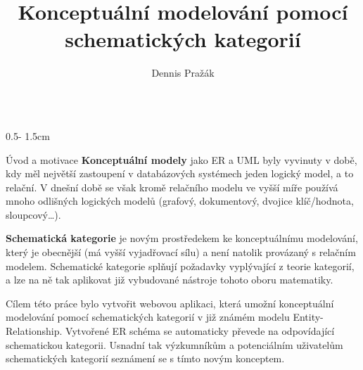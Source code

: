 \documentclass[a0paper]{uioposter}
\title{Konceptuální modelování pomocí schematických kategorií}
\author{Dennis Pražák}
\institute{prazak.dennis@gmail.com}
\begin{document}
\begin{frame}
  \begin{columns}[onlytextwidth]
    \begin{column}{0.5\textwidth - 1.5cm}
      \begin{block}{Úvod a motivace}
        \textbf{\alert{Konceptuální modely}} jako ER a UML byly vyvinuty v době, kdy měl největší zastoupení v databázových systémech jeden logický model, a to relační.
        V dnešní době se však kromě relačního modelu ve vyšší míře používá mnoho odlišných logických modelů (grafový, dokumentový, dvojice klíč/hodnota, sloupcový\dots).

        \textbf{\alert{Schematická kategorie}} je novým prostředekem ke konceptuálnímu modelování, který je obecnější (má vyšší vyjadřovací sílu) a není natolik provázaný s relačním modelem.
        Schematické kategorie splňují požadavky vyplývající z teorie kategorií, a lze na ně tak aplikovat již vybudované nástroje tohoto oboru matematiky.

        Cílem této práce bylo vytvořit webovou aplikaci, která umožní konceptuální modelování pomocí schematických kategorií v již známém modelu Entity-Relationship.
        Vytvořené ER schéma se automaticky převede na odpovídající schematickou kategorii.
        Usnadní tak výzkumníkům a potenciálním uživatelům schematických kategorií seznámení se s tímto novým konceptem.
      \end{block}


\end{column}
\end{columns}
\end{frame}
\end{document}
